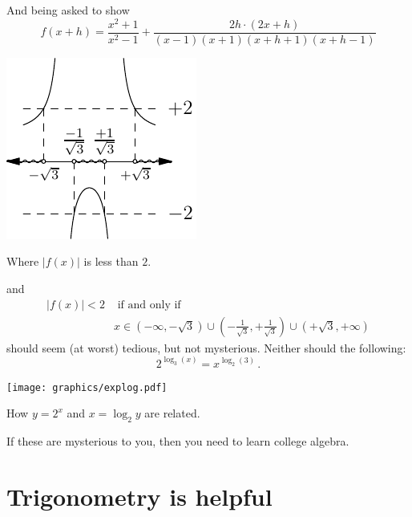 \documentclass{tufte-book} %
\begin{document}
And being asked to show
\begin{equation*}
    f(x+h)=\frac{x^2+1}{x^2-1}+ \frac{2h\cdot(2x+h)}{(x-1)(x+1)(x+h+1)(x+h-1)}
\end{equation*}
\begin{marginfigure}
\includegraphics[width=0.75\linewidth]{graphics/algebra2.pdf}
\caption{Where $|f(x)|$ is less than $2$.}
\label{fig:algebra2}
\end{marginfigure}
and
\begin{align*}
  |f(x)|<2 & \text{ if and only if } \\
           &  x \in (-\infty,-\sqrt{3})\cup(-\frac{1}{\sqrt{3}},+\frac{1}{\sqrt{3}})\cup(+\sqrt{3},+\infty)
\end{align*}
should seem (at worst) tedious, but not mysterious.  Neither should the following:
\begin{equation*}
    2^{\log_3(x)}=x^{\log_2(3)} \,.
\end{equation*}
\begin{marginfigure}
\texttt{[image: graphics/explog.pdf]}
\caption{How $y=2^x$ and $x=\log_2 y$ are related.}
\label{fig:explog}
\end{marginfigure}

If these are mysterious to you, then you need to learn college algebra.
\section*{Trigonometry is helpful}
\end{document}
